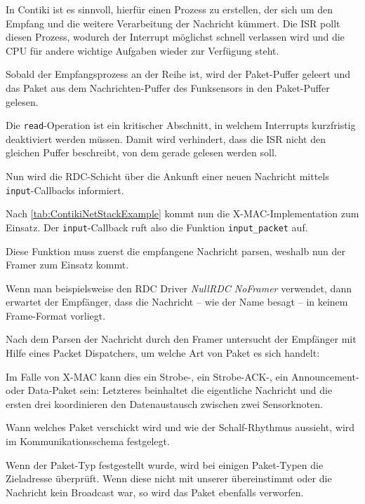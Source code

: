 	In Contiki ist es sinnvoll, hierfür einen Prozess zu erstellen, der
	sich um den Empfang und die weitere Verarbeitung der Nachricht kümmert.
	Die \ac{ISR} pollt diesen Prozess, wodurch der Interrupt möglichst
	schnell verlassen wird und die CPU für andere wichtige Aufgaben wieder
	zur Verfügung steht.

	Sobald der Empfangsprozess an der Reihe ist, wird der Paket-Puffer
	geleert und das Paket aus dem Nachrichten-Puffer des Funksensors in den
	Paket-Puffer gelesen.

	Die \lstinline=read=-Operation ist ein kritischer Abschnitt, in welchem
	Interrupts kurzfristig deaktiviert werden müssen.  Damit wird
	verhindert, dass die \ac{ISR} nicht den gleichen Puffer beschreibt, von
	dem gerade gelesen werden soll.

	Nun wird die \ac{RDC}-Schicht über die Ankunft einer neuen Nachricht
	mittels \lstinline=input=-Callbacks informiert.



	Nach \autoref{tab:ContikiNetStackExample} kommt nun die
	X-MAC-Implementation zum Einsatz. Der \lstinline=input=-Callback ruft also
	die Funktion \lstinline=input_packet= auf.

	Diese Funktion muss zuerst die empfangene Nachricht parsen, weshalb nun
	der Framer zum Einsatz kommt.

	Wenn man beispielsweise den RDC Driver \emph{NullRDC NoFramer}
	verwendet, dann erwartet der Empfänger, dass die Nachricht -- wie der
	Name besagt -- in keinem Frame-Format vorliegt.

\medskip

	Nach dem Parsen der Nachricht durch den Framer untersucht der Empfänger
	mit Hilfe eines Packet Dispatchers, um welche Art von Paket es sich
	handelt:

	Im Falle von X-MAC kann dies ein Strobe-, ein Strobe-ACK-, ein
	Announcement- oder Data-Paket sein: Letzteres beinhaltet die
	eigentliche Nachricht und die ersten drei koordinieren den
	Datenaustausch zwischen zwei Sensorknoten.

	Wann welches Paket verschickt wird und wie der Schalf-Rhythmus
	aussieht, wird im Kommunikationsschema festgelegt.

	Wenn der Paket-Typ festgestellt wurde, wird bei einigen Paket-Typen die
	Zieladresse überprüft. Wenn diese nicht mit unserer übereinstimmt oder
	die Nachricht kein Broadcast war, so wird das Paket ebenfalls
	verworfen.

